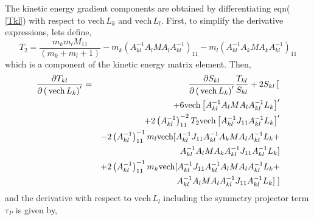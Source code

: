 \documentclass[12pt,doublespace]{article}
\begin{document}
The kinetic energy gradient components are obtained by differentiating eqn(%
\ref{Tkl}) with respect to $\mathrm{vech}\,L_{k}$ and $\mathrm{vech}\,L_{l}.$
First, to simplify the derivative expressions, lets define, 
\begin{equation}
T_{2}=\frac{m_{k}m_{l}M_{11}}{\left( m_{k}+m_{l}+1\right) }-m_{k}\left(
A_{kl}^{-1}A_{l}MA_{l}A_{kl}^{-1}\right) _{11}-m_{l}\left(
A_{kl}^{-1}A_{k}MA_{k}A_{kl}^{-1}\right) _{11}
\end{equation}
which is a component of the kinetic energy matrix element. Then, 
\begin{eqnarray}
\frac{\partial T_{kl}}{\partial \left( \,\mathrm{vech}\,L_{k}\right)
^{\prime }} &=&\frac{\partial S_{kl}}{\partial \left( \,\mathrm{vech}%
\,L_{k}\right) ^{\prime }}\frac{T_{kl}}{S_{kl}}+2S_{kl}\left[ 
\begin{array}{c}
\end{array}
\right.   \notag \\
&&+6\mathrm{vech}\left[ A_{kl}^{-1}A_{l}MA_{l}A_{kl}^{-1}L_{k}\right]
^{\prime }  \notag \\
&&+2\left( A_{kl}^{-1}\right) _{11}^{-2}T_{2}\mathrm{vech}\left[
A_{kl}^{-1}J_{11}A_{kl}^{-1}L_{k}\right] ^{\prime }  \notag \\
&&-2\left( A_{kl}^{-1}\right) _{11}^{-1}m_{l}\mathrm{vech[}%
A_{kl}^{-1}J_{11}A_{kl}^{-1}A_{k}MA_{l}A_{kl}^{-1}L_{k}+  \notag \\
&&\quad \quad \quad \,\quad
A_{kl}^{-1}A_{l}MA_{k}A_{kl}^{-1}J_{11}A_{kl}^{-1}L_{k}]  \notag \\
&&+2\left( A_{kl}^{-1}\right) _{11}^{-1}m_{k}\mathrm{vech[}%
A_{kl}^{-1}J_{11}A_{kl}^{-1}A_{l}MA_{l}A_{kl}^{-1}L_{k}+  \notag \\
&&\quad \quad \quad \quad
A_{kl}^{-1}A_{l}MA_{l}A_{kl}^{-1}J_{11}A_{kl}^{-1}L_{k}]\left. 
\begin{array}{c}
\end{array}
\right] 
\end{eqnarray}
and the derivative with respect to $\mathrm{vech}\,L_{l}$ including the
symmetry projector term $\tau _{P}$ is given by, 
\end{document}

